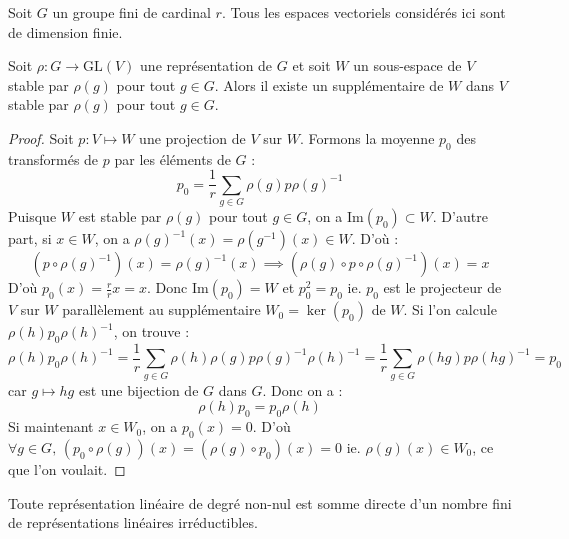 






	Soit $G$ un groupe fini de cardinal $r$. Tous les espaces vectoriels considérés ici sont de dimension finie.

	\medskip

	\begin{lemma}
		\label{theoreme-de-maschke-1}
		Soit $\rho : G \rightarrow \mathrm{GL}(V)$ une représentation de $G$ et soit $W$ un sous-espace de $V$ stable par $\rho(g)$ pour tout $g \in G$. Alors il existe un supplémentaire de $W$ dans $V$ stable par $\rho(g)$ pour tout $g \in G$.
	\end{lemma}

	\begin{proof}
		Soit $p : V \mapsto W$ une projection de $V$ sur $W$. Formons la moyenne $p_0$ des transformés de $p$ par les éléments de $G$ :
		\[ p_0 = \frac{1}{r} \sum_{g \in G} \rho(g) p \rho(g)^{-1} \]
		Puisque $W$ est stable par $\rho(g)$ pour tout $g \in G$, on a $\mathrm{Im}(p_0) \subset W$.
		\newpar
		D'autre part, si $x \in W$, on a $\rho(g)^{-1}(x) = \rho(g^{-1})(x) \in W$. D'où :
		\[ (p \circ \rho(g)^{-1})(x) = \rho(g)^{-1}(x) \implies (\rho(g) \circ p \circ \rho(g)^{-1})(x) = x \]
		D'où $p_0(x) = \frac{r}{r} x = x$. Donc $\mathrm{Im}(p_0) = W$ et $p_0^2 = p_0$ ie. $p_0$ est le projecteur de $V$ sur $W$ parallèlement au supplémentaire $W_0 = \ker(p_0)$ de $W$.
		\newpar
		Si l'on calcule $\rho(h) p_0 \rho(h)^{-1}$, on trouve :
		\[ \rho(h) p_0 \rho(h)^{-1} = \frac{1}{r} \sum_{g \in G} \rho(h) \rho(g) p \rho(g)^{-1} \rho(h)^{-1} = \frac{1}{r} \sum_{g \in G} \rho(hg) p \rho(hg)^{-1} = p_0 \]
		car $g \mapsto hg$ est une bijection de $G$ dans $G$. Donc on a :
		\[ \rho(h) p_0 = p_0 \rho(h) \]
		Si maintenant $x \in W_0$, on a $p_0(x) = 0$. D'où $\forall g \in G, \, (p_0 \circ \rho(g))(x) = (\rho(g) \circ p_0)(x) = 0$ ie. $\rho(g)(x) \in W_0$, ce que l'on voulait.
	\end{proof}

	\begin{theorem}[Maschke]
		Toute représentation linéaire de degré non-nul est somme directe d'un nombre fini de représentations linéaires irréductibles.
	\end{theorem}

